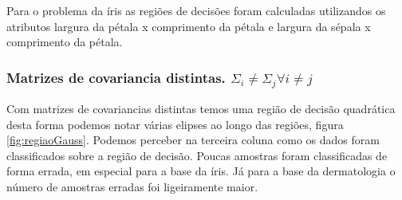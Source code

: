 \documentclass[ 
	article,			%
	11pt,				%
	oneside,			%
	a4paper,			%
	english,			%
	brazil,				%
	]{abntex2}
\begin{document}
Para o problema da íris as regiões de decisões foram calculadas utilizandos os
atributos largura da pétala x comprimento da pétala e largura da sépala x
comprimento da pétala.

\subsubsection{ Matrizes de covariancia distintas. $\Sigma_i \neq \Sigma_j
\forall i \neq j $ } Com matrizes de covariancias distintas temos uma região de
decisão quadrática desta forma podemos notar várias elipses ao longo das
regiões, figura \ref{fig:regiaoGauss}. Podemos perceber na terceira coluna como
os dados foram classificados sobre a região de decisão. Poucas amostras foram
classificadas de forma errada, em especial para a base da íris. Já para a base
da dermatologia o número de amostras erradas foi ligeiramente maior.
\end{document}

